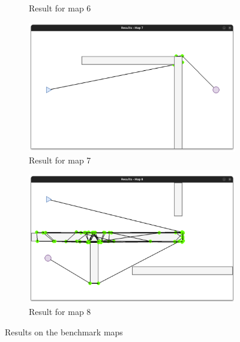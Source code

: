 \documentclass[../main.tex]{subfiles}
\begin{document}
\begin{figure}[H]
\begin{subfigure}[b]{0.24\textwidth}
		\caption*{Result for map 6}
		\label{fig:rmap6}
	\end{subfigure}
	\hfill
	\begin{subfigure}[b]{0.24\textwidth}
		\centering
		\includegraphics[width=\textwidth]{IMAGES/part3/rmap7.png}
		\caption*{Result for map 7}
		\label{fig:rmap7}
	\end{subfigure}
	\hfill
	\begin{subfigure}[b]{0.24\textwidth}
		\centering
		\includegraphics[width=\textwidth]{IMAGES/part3/rmap8.png}
		\caption*{Result for map 8}
		\label{fig:rmap8}
	\end{subfigure}
	\caption{Results on the benchmark maps}
	\label{fig:results_benchmark_maps}
\end{figure}
\end{document}
